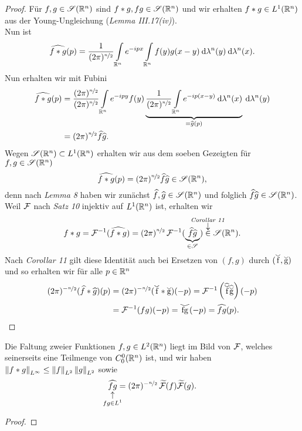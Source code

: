 \documentclass[skript.tex]{subfiles}
\begin{document}
	\begin{proof}
		Für $f,g\in\mathscr{S}(\mathbb{R}^n)$ sind $f \ast g, fg \in \mathscr{S}(\mathbb{R}^n)$ und wir erhalten $f \ast g \in L^1(\mathbb{R}^n)$ aus der Young-Ungleichung (\emph{Lemma III.17(iv)}).\\
		Nun ist
		\[
			\widehat{f \ast g}(p) = \frac{1}{(2\pi)^{\nicefrac{n}{2}}} \int\limits_{\mathbb{R}^n} e^{-ipx} \int\limits_{\mathbb{R}^n} f(y)g(x-y) \: \mathrm{d}\lambda^n(y)\: \mathrm{d}\lambda^n(x).
		\]
		Nun erhalten wir mit Fubini
		\begin{align*}
			\widehat{f \ast g}(p) &= \frac{(2\pi)^{\nicefrac{n}{2}}}{(2\pi)^{\nicefrac{n}{2}}} \int\limits_{\mathbb{R}^n} e^{-ipy} f(y) \underbrace{\frac{1}{(2\pi)^{\nicefrac{n}{2}}} \int\limits_{\mathbb{R}^n} e^{-ip(x-y)} \: \mathrm{d}\lambda^n(x)}_{= \widehat{g}(p)}\: \mathrm{d}\lambda^n(y) \\
			 &= (2\pi)^{\nicefrac{n}{2}} \widehat{f}\widehat{g}.
		\end{align*}
		Wegen $\mathscr{S}(\mathbb{R}^n) \subset L^1(\mathbb{R}^n)$ erhalten wir aus dem soeben Gezeigten für $f,g\in\mathscr{S}(\mathbb{R}^n)$
		\[
				\widehat{f \ast g}(p) = (2\pi)^{\nicefrac{n}{2}} \widehat{f}\widehat{g} \in \mathscr{S}(\mathbb{R}^n),
		\]
		denn nach \emph{Lemma 8} haben wir zunächst $\widehat{f},\widehat{g}\in\mathscr{S}(\mathbb{R}^n)$ und folglich $\widehat{f}\widehat{g} \in \mathscr{S}(\mathbb{R}^n)$.\\
		Weil $\mathcal{F}$ nach \emph{Satz 10} injektiv auf $L^1(\mathbb{R}^n)$ ist, erhalten wir
		\[
			f \ast g = \F^{-1}(\wh{f \ast g}) = (2\pi)^{\nicefrac{n}{2}}\, \F^{-1}(\underbrace{\wh{f}\wh{g}}_{\in \ms{S}}) \darrow{\text{\emph{Corollar 11}}}{\in} \ms{S}(\R^n).
		\]
		Nach \emph{Corollar 11} gilt diese Identität auch bei Ersetzen von $(f,g)$ durch $(\wc{f},\wc{g})$ und so erhalten wir für alle $p \in \mathbb{R}^n$
		\begin{align*}
			(2\pi)^{-\nicefrac{n}{2}}(\wh{f}\ast\wh{g})(p) &= (2\pi)^{-\nicefrac{n}{2}}(\wc{f}\ast\wc{g})(-p) = \F^{-1}\left(\wh{\wc{f}}\wh{\wc{g}}\right)(-p)\\
			&= \F^{-1}(fg)(-p) = \wc{fg}(-p) = \wh{fg}(p).
		\end{align*}
	\end{proof}

	\begin{cor}
		Die Faltung zweier Funktionen $f,g \in L^2(\mathbb{R}^n)$ liegt im Bild von $\mathcal{F}$, welches seinerseits eine Teilmenge von $C_0^0(\mathbb{R}^n)$ ist, und wir haben $\left\lVert f \ast g \right\rVert_{L^\infty} \leq \left\lVert f \right\rVert_{L^2} \left\lVert g \right\rVert_{L^2}$ sowie
		\[
			\uarrow{fg \in L^1}{\wh{fg}} = (2\pi)^{-\nicefrac{n}{2}}\, \wt{\F}(f)\wt{\F}(g).
		\]
	\end{cor}
	\begin{proof}
	\end{proof}
\end{document}
